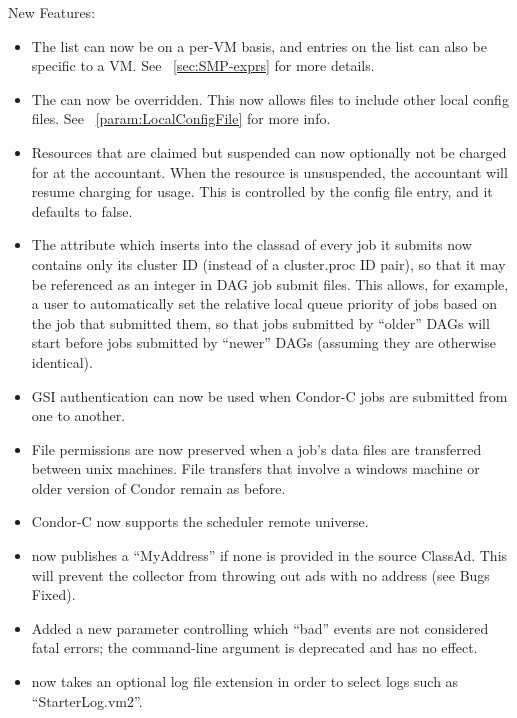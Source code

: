 \noindent New Features:

\begin{itemize}

\item The  list can now be on a per-VM basis, and
entries on the list can also be specific to a VM. 
See ~\ref{sec:SMP-exprs} for more details.

\item The  can now be overridden. 
This now allows files to include other local config files. 
See ~\ref{param:LocalConfigFile} for more info.

\item Resources that are claimed but suspended can now optionally 
not be charged for at the accountant. 
When the resource is unsuspended, the accountant will resume charging
for usage. 
This is controlled by the 
config file entry, and it defaults to false.

\item The  attribute which  inserts
into the classad of every job it submits now contains only its cluster
ID (instead of a cluster.proc ID pair), so that it may be referenced
as an integer in DAG job submit files.  This allows, for example, a
user to automatically set the relative local queue priority of jobs
based on the  job that submitted them, so that jobs
submitted by ``older'' DAGs will start before jobs submitted by
``newer'' DAGs (assuming they are otherwise identical).

\item GSI authentication can now be used when Condor-C jobs are submitted
from one  to another.

\item File permissions are now preserved when a job's data files are
transferred between unix machines. File transfers that involve a windows
machine or older version of Condor remain as before.

\item Condor-C now supports the scheduler remote universe.

\item {} now publishes a ``MyAddress'' if none is provided
in the source ClassAd.  This will prevent the collector from throwing out
ads with no address (see Bugs Fixed).

\item Added a new  parameter 
controlling which ``bad'' events are not considered fatal errors;
the  command-line argument is deprecated and has no effect.

\item {} now takes an optional log file extension in order to
select logs such as ``StarterLog.vm2''.

\end{itemize}


